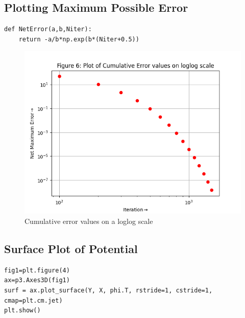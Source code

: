 \documentclass{article}
\begin{document}
\subsection{Plotting Maximum Possible Error}
\begin{lstlisting}
def NetError(a,b,Niter):
    return -a/b*np.exp(b*(Niter+0.5))
\end{lstlisting}

\begin{figure}[h!]
\centering
\includegraphics[scale=0.55]{6}
\caption{Cumulative error values on a loglog scale}
\label{fig:3d Plot of Potential}
\end{figure}

\clearpage

\subsection{Surface Plot of Potential}
\begin{lstlisting}
fig1=plt.figure(4)
ax=p3.Axes3D(fig1)
surf = ax.plot_surface(Y, X, phi.T, rstride=1, cstride=1, cmap=plt.cm.jet)
plt.show()
\end{lstlisting}
\end{document}
